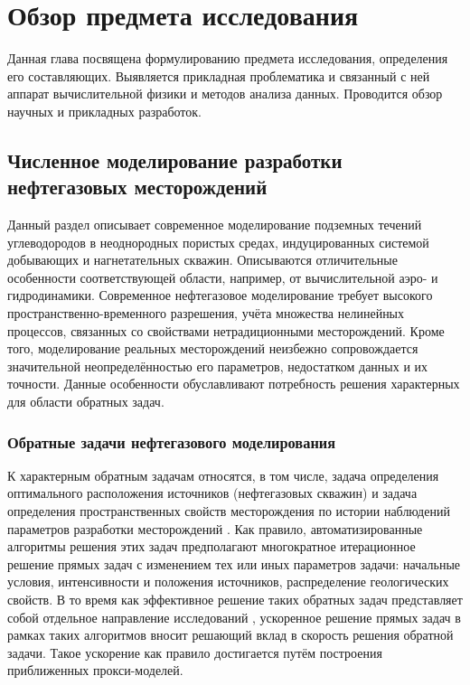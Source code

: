 \chapter{Обзор предмета исследования}\label{ch:ch1}
Данная глава посвящена формулированию предмета исследования, определения его составляющих.
Выявляется прикладная проблематика и связанный с ней аппарат вычислительной физики и методов анализа данных. Проводится обзор научных и прикладных разработок.

\section{Численное моделирование разработки нефтегазовых месторождений}

Данный раздел описывает современное моделирование подземных течений углеводородов в неоднородных пористых средах, индуцированных системой добывающих и нагнетательных скважин.
Описываются отличительные особенности соответствующей области, например, от вычислительной аэро- и гидродинамики.
Современное нефтегазовое моделирование требует высокого пространственно-временного разрешения, учёта множества нелинейных процессов, связанных со свойствами нетрадиционными месторождений.
Кроме того, моделирование реальных месторождений неизбежно сопровождается значительной неопределённостью его параметров, недостатком данных и их точности.
Данные особенности обуславливают потребность решения характерных для области обратных задач.

\subsection{Обратные задачи нефтегазового моделирования}
К характерным обратным задачам относятся, в том числе, задача определения оптимального расположения источников (нефтегазовых скважин) \todo{\cite{}} и задача определения пространственных свойств месторождения по истории наблюдений параметров разработки месторождений \todo{\cite{}}.
Как правило, автоматизированные алгоритмы решения этих задач предполагают многократное итерационное решение прямых задач с изменением тех или иных параметров задачи: начальные условия, интенсивности и положения источников, распределение геологических свойств. В то время как эффективное решение таких обратных задач представляет собой отдельное направление исследований , ускоренное решение прямых задач в рамках таких алгоритмов вносит решающий вклад в скорость решения обратной задачи. Такое ускорение как правило достигается путём построения приближенных прокси-моделей.

